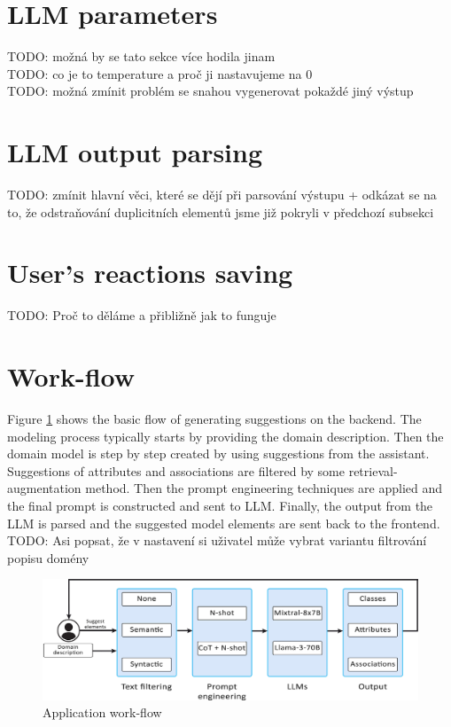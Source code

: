 \section{LLM parameters}

TODO: možná by se tato sekce více hodila jinam \\

TODO: co je to temperature a proč ji nastavujeme na 0 \\

TODO: možná zmínit problém se snahou vygenerovat pokaždé jiný výstup \\


\section{LLM output parsing}

TODO: zmínit hlavní věci, které se dějí při parsování výstupu + odkázat se na to, že odstraňování duplicitních elementů jsme již pokryli v předchozí subsekci \\


\section{User's reactions saving}

TODO: Proč to děláme a přibližně jak to funguje \\


\section{Work-flow}

Figure \ref{fig:work-flow} shows the basic flow of generating suggestions on the backend. The modeling process typically starts by providing the domain description. Then the domain model is step by step created by using suggestions from the assistant. Suggestions of attributes and associations are filtered by some retrieval-augmentation method. Then the prompt engineering techniques are applied and the final prompt is constructed and sent to LLM. Finally, the output from the LLM is parsed and the suggested model elements are sent back to the frontend. \\

TODO: Asi popsat, že v nastavení si uživatel může vybrat variantu filtrování popisu domény \\

\begin{figure}[!h]
    \centering
    \includegraphics[scale=0.23]{img/work-flow.jpg}
    \caption{\centering Application work-flow}
    \label{fig:work-flow}
\end{figure}
